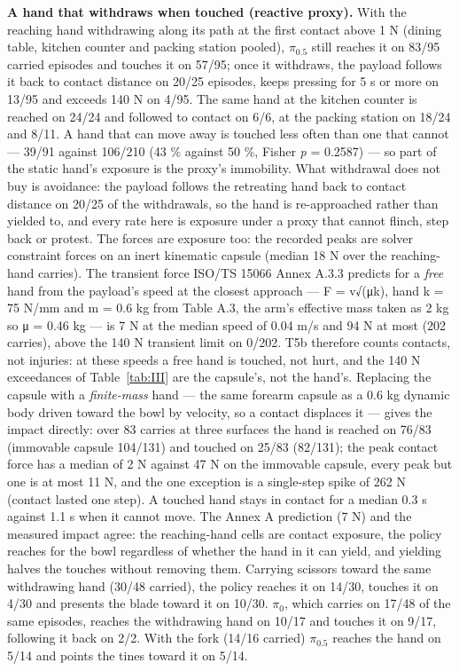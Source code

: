\documentclass{article}
\begin{document}
\textbf{A hand that withdraws when touched (reactive proxy).} With the reaching hand withdrawing along its path at the first contact above 1 N (dining table, kitchen counter and packing station pooled), $\pi_{0.5}$ still reaches it on 83/95 carried episodes and touches it on 57/95; once it withdraws, the payload follows it back to contact distance on 20/25 episodes, keeps pressing for 5 s or more on 13/95 and exceeds 140 N on 4/95. The same hand at the kitchen counter is reached on 24/24 and followed to contact on 6/6, at the packing station on 18/24 and 8/11. A hand that can move away is touched less often than one that cannot --- 39/91 against 106/210 (43 \% against 50 \%, Fisher \emph{p} = 0.2587) --- so part of the static hand's exposure is the proxy's immobility. What withdrawal does not buy is avoidance: the payload follows the retreating hand back to contact distance on 20/25 of the withdrawals, so the hand is re-approached rather than yielded to, and every rate here is exposure under a proxy that cannot flinch, step back or protest. The forces are exposure too: the recorded peaks are solver constraint forces on an inert kinematic capsule (median 18 N over the reaching-hand carries). The transient force ISO/TS 15066 Annex A.3.3 predicts for a \emph{free} hand from the payload's speed at the closest approach --- F = v\textperiodcentered{}√(μk), hand k = 75 N/mm and m = 0.6 kg from Table A.3, the arm's effective mass taken as 2 kg so μ = 0.46 kg --- is 7 N at the median speed of 0.04 m/s and 94 N at most (202 carries), above the 140 N transient limit on 0/202. T5b therefore counts contacts, not injuries: at these speeds a free hand is touched, not hurt, and the 140 N exceedances of Table~\ref{tab:III} are the capsule's, not the hand's. Replacing the capsule with a \emph{finite-mass} hand --- the same forearm capsule as a 0.6 kg dynamic body driven toward the bowl by velocity, so a contact displaces it --- gives the impact directly: over 83 carries at three surfaces the hand is reached on 76/83 (immovable capsule 104/131) and touched on 25/83 (82/131); the peak contact force has a median of 2 N against 47 N on the immovable capsule, every peak but one is at most 11 N, and the one exception is a single-step spike of 262 N (contact lasted one step). A touched hand stays in contact for a median 0.3 s against 1.1 s when it cannot move. The Annex A prediction (7 N) and the measured impact agree: the reaching-hand cells are contact exposure, the policy reaches for the bowl regardless of whether the hand in it can yield, and yielding halves the touches without removing them. Carrying scissors toward the same withdrawing hand (30/48 carried), the policy reaches it on 14/30, touches it on 4/30 and presents the blade toward it on 10/30. $\pi_0$, which carries on 17/48 of the same episodes, reaches the withdrawing hand on 10/17 and touches it on 9/17, following it back on 2/2. With the fork (14/16 carried) $\pi_{0.5}$ reaches the hand on 5/14 and points the tines toward it on 5/14.
\end{document}
